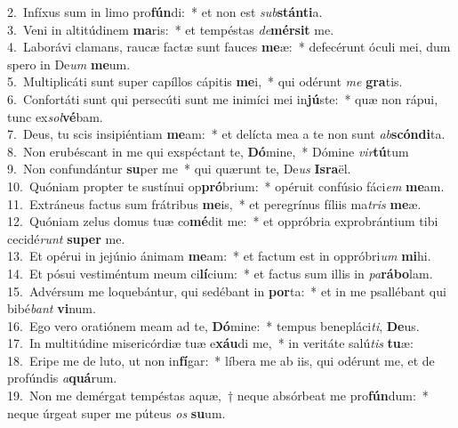{2.~}Infíxus sum in limo pro\textbf{fún}di:~* et non est \textit{sub}\textbf{stán}\textbf{ti}a.\\
{3.~}Veni in altitúdinem \textbf{ma}ris:~* et tempéstas \textit{de}\textbf{mér}\textbf{sit} me.\\
{4.~}Laborávi clamans, raucæ factæ sunt fauces \textbf{me}æ:~* defecérunt óculi mei, dum spero in De\textit{um} \textbf{me}um.\\
{5.~}Multiplicáti sunt super capíllos cápitis \textbf{me}i,~* qui odérunt \textit{me} \textbf{gra}tis.\\
{6.~}Confortáti sunt qui persecúti sunt me inimíci mei in\textbf{jú}ste:~* quæ non rápui, tunc ex\textit{sol}\textbf{vé}bam.\\
{7.~}Deus, tu scis insipiéntiam \textbf{me}am:~* et delícta mea a te non sunt \textit{ab}\textbf{scón}\textbf{di}ta.\\
{8.~}Non erubéscant in me qui exspéctant te, \textbf{Dó}mine,~* Dómine \textit{vir}\textbf{tú}tum\\
{9.~}Non confundántur \textbf{su}per me~* qui quærunt te, De\textit{us} \textbf{Is}\textbf{ra}ël.\\
{10.~}Quóniam propter te sustínui op\textbf{pró}brium:~* opéruit confúsio fáci\textit{em} \textbf{me}am.\\
{11.~}Extráneus factus sum frátribus \textbf{me}is,~* et peregrínus fíliis ma\textit{tris} \textbf{me}æ.\\
{12.~}Quóniam zelus domus tuæ co\textbf{mé}dit me:~* et oppróbria exprobrántium tibi cecidé\textit{runt} \textbf{su}\textbf{per} me.\\
{13.~}Et opérui in jejúnio ánimam \textbf{me}am:~* et factum est in oppróbri\textit{um} \textbf{mi}hi.\\
{14.~}Et pósui vestiméntum meum ci\textbf{lí}cium:~* et factus sum illis in \textit{pa}\textbf{rá}\textbf{bo}lam.\\
{15.~}Advérsum me loquebántur, qui sedébant in \textbf{por}ta:~* et in me psallébant qui bibé\textit{bant} \textbf{vi}num.\\
{16.~}Ego vero oratiónem meam ad te, \textbf{Dó}mine:~* tempus benepláci\textit{ti}, \textbf{De}us.\\
{17.~}In multitúdine misericórdiæ tuæ e\textbf{xáu}di me,~* in veritáte salú\textit{tis} \textbf{tu}æ:\\
{18.~}Eripe me de luto, ut non in\textbf{fí}gar:~* líbera me ab iis, qui odérunt me, et de profúndis \textit{a}\textbf{quá}rum.\\
{19.~}Non me demérgat tempéstas aquæ,~† neque absórbeat me pro\textbf{fún}dum:~* neque úrgeat super me púteus \textit{os} \textbf{su}um.\\
